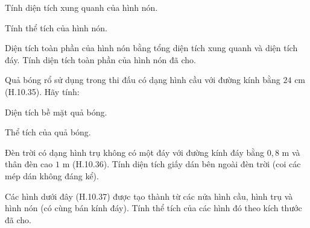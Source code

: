 \begin{exercises}
\begin{questions}[resume=SGK]
        \begin{questions}
            \item Tính diện tích xung quanh của hình nón.
            \item Tính thể tích của hình nón.
            \item Diện tích toàn phần của hình nón bằng tổng diện tích xung quanh và diện tích đáy. Tính diện tích toàn phần của hình nón đã cho.
        \end{questions}
        \answerline
        \answerline
        \answerline

        \item Quả bóng rổ sử dụng trong thi đấu có dạng hình cầu với đường kính bằng $24$ cm (H.10.35). Hãy tính:
        \begin{questions}
            \item Diện tích bề mặt quả bóng.
            \item Thể tích của quả bóng.
        \end{questions}
        \answerline
        \answerline

        \item Đèn trời có dạng hình trụ không có một đáy với đường kính đáy bằng $0{,}8$ m và thân đèn cao $1$ m (H.10.36). Tính diện tích giấy dán bên ngoài đèn trời (coi các mép dán không đáng kể).
        \answerline
        \answerline

        \item Các hình dưới đây (H.10.37) được tạo thành từ các nửa hình cầu, hình trụ và hình nón (có cùng bán kính đáy). Tính thể tích của các hình đó theo kích thước đã cho.

        \begin{center}
\end{center}
\end{questions}
\end{exercises}
